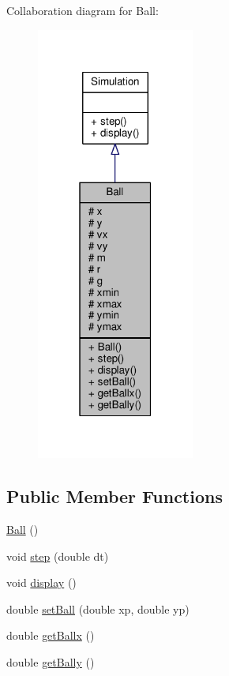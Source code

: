 Collaboration diagram for Ball\+:
\nopagebreak
\begin{figure}[H]
\begin{center}
\leavevmode
\includegraphics[width=147pt]{classBall__coll__graph}
\end{center}
\end{figure}
\subsection*{Public Member Functions}
\begin{DoxyCompactItemize}
\item 
\hyperlink{classBall_a86a144d3dad6c953e422e32435923bbb}{Ball} ()
\item 
void \hyperlink{classBall_a92dc65e1ed710ff01a4cbbb591ad7cb3}{step} (double dt)
\item 
void \hyperlink{classBall_a4a575db97fe36b3caa001ade4affeb18}{display} ()
\item 
double \hyperlink{classBall_a5de2a9c31906ebd899e51c6ddca7ef3a}{set\+Ball} (double xp, double yp)
\item 
double \hyperlink{classBall_a683551ec9c891d1420a1aab806bfef43}{get\+Ballx} ()
\item 
double \hyperlink{classBall_ae0b2224e6fbc8897ce132b229ceab446}{get\+Bally} ()
\end{DoxyCompactItemize}
